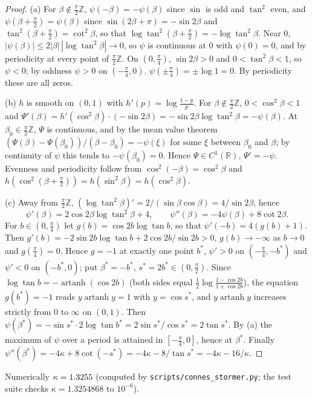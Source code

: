\documentclass[11pt]{article}
\DeclareMathOperator{\artanh}{artanh}
\newcommand{\R}{\mathbb{R}}
\newcommand{\Z}{\mathbb{Z}}
\theoremstyle{plain}
\theoremstyle{definition}
\theoremstyle{remark}
\begin{document}
\begin{proof}
(a) For $\beta\notin\frac\pi2\Z$, $\psi(-\beta)=-\psi(\beta)$ since $\sin$ is odd and $\tan^2$ even, and
$\psi(\beta+\frac\pi2)=\psi(\beta)$ since $\sin(2\beta+\pi)=-\sin2\beta$ and $\tan^2(\beta+\frac\pi2)=\cot^2\beta$, so that
$\log\tan^2(\beta+\frac\pi2)=-\log\tan^2\beta$. Near $0$, $|\psi(\beta)|\le2|\beta|\,|\log\tan^2\beta|\to0$, so $\psi$ is
continuous at $0$ with $\psi(0)=0$, and by periodicity at every point of $\frac\pi2\Z$. On $(0,\frac\pi4)$, $\sin2\beta>0$ and
$0<\tan^2\beta<1$, so $\psi<0$; by oddness $\psi>0$ on $(-\frac\pi4,0)$. $\psi(\pm\frac\pi4)=\pm\log1=0$. By periodicity these
are all zeros.

(b) $h$ is smooth on $(0,1)$ with $h'(p)=\log\frac{1-p}p$. For $\beta\notin\frac\pi2\Z$, $0<\cos^2\beta<1$ and
$\Psi'(\beta)=h'(\cos^2\beta)\cdot(-\sin2\beta)=-\sin2\beta\log\tan^2\beta=-\psi(\beta)$. At $\beta_0\in\frac\pi2\Z$, $\Psi$ is
continuous, and by the mean value theorem $(\Psi(\beta)-\Psi(\beta_0))/(\beta-\beta_0)=-\psi(\xi)$ for some $\xi$ between
$\beta_0$ and $\beta$; by continuity of $\psi$ this tends to $-\psi(\beta_0)=0$. Hence $\Psi\in C^1(\R)$, $\Psi'=-\psi$. Evenness and
periodicity follow from $\cos^2(-\beta)=\cos^2\beta$ and $h(\cos^2(\beta+\frac\pi2))=h(\sin^2\beta)=h(\cos^2\beta)$.

(c) Away from $\frac\pi2\Z$, $(\log\tan^2\beta)'=2/(\sin\beta\cos\beta)=4/\sin2\beta$, hence
\[
  \psi'(\beta)=2\cos2\beta\log\tan^2\beta+4,\qquad \psi''(\beta)=-4\psi(\beta)+8\cot2\beta .
\]
For $b\in(0,\frac\pi4)$ let $g(b)=\cos2b\log\tan b$, so that $\psi'(-b)=4(g(b)+1)$. Then $g'(b)=-2\sin2b\log\tan b+2\cos2b/\sin2b>0$,
$g(b)\to-\infty$ as $b\to0$ and $g(\frac\pi4)=0$. Hence $g=-1$ at exactly one point $b^*$, $\psi'>0$ on $(-\frac\pi4,-b^*)$ and
$\psi'<0$ on $(-b^*,0)$; put $\beta^*=-b^*$, $s^*=2b^*\in(0,\frac\pi2)$. Since $\log\tan b=-\artanh(\cos2b)$ (both sides equal
$\frac12\log\frac{1-\cos2b}{1+\cos2b}$), the equation $g(b^*)=-1$ reads $y\artanh y=1$ with $y=\cos s^*$, and $y\artanh y$ increases
strictly from $0$ to $\infty$ on $(0,1)$. Then $\psi(\beta^*)=-\sin s^*\cdot2\log\tan b^*=2\sin s^*/\cos s^*=2\tan s^*$. By (a)
the maximum of $\psi$ over a period is attained in $[-\frac\pi4,0]$, hence at $\beta^*$. Finally
$\psi''(\beta^*)=-4\kappa+8\cot(-s^*)=-4\kappa-8/\tan s^*=-4\kappa-16/\kappa$.
\end{proof}

\noindent Numerically $\kappa=1.3255$ (computed by \texttt{scripts/connes\_\allowbreak stormer.py}; the test suite checks
$\kappa=1.3254868$ to $10^{-6}$).
\end{document}
